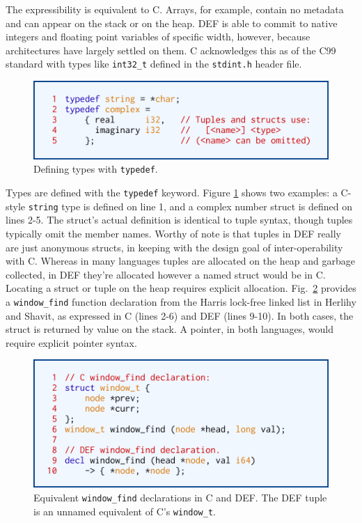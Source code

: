 The expressibility is equivalent to C.  Arrays, for example, contain no metadata and can appear on the stack or on the heap.  DEF is able to commit to native integers and floating point variables of specific width, however, because architectures have largely settled on them.  C acknowledges this as of the C99 standard with types like \texttt{int32\_t} defined in the \texttt{stdint.h} header file.\cite{C99FWInts}

\begin{figure}[htbp!]
        \centering
        \includegraphics[scale=0.25]{gfx/typedef}
        \caption{Defining types with \texttt{typedef}.}
        \label{fig:typedef}
\end{figure}

Types are defined with the \texttt{typedef} keyword.  Figure \ref{fig:typedef} shows two examples: a C-style \texttt{string} type is defined on line 1, and a complex number struct is defined on lines 2-5.  The struct's actual definition is identical to tuple syntax, though tuples typically omit the member names.  Worthy of note is that tuples in DEF really are just anonymous structs, in keeping with the design goal of inter-operability with C.  Whereas in many languages tuples are allocated on the heap and garbage collected, in DEF they're allocated however a named struct would be in C.  Locating a struct or tuple on the heap requires explicit allocation.  Fig.~\ref{fig:window-find} provides a \texttt{window\_{}find} function declaration from the Harris lock-free linked list\cite{Harris} in Herlihy and Shavit,\cite{HSBook} as expressed in C (lines 2-6) and DEF (lines 9-10).  In both cases, the struct is returned by value on the stack.  A pointer, in both languages, would require explicit pointer syntax.

\begin{figure}[htbp!]
        \centering
        \includegraphics[scale=0.25]{gfx/window-find}
        \caption{Equivalent \texttt{window\_{}find} declarations in C and DEF.  The DEF tuple is an unnamed equivalent of C's \texttt{window\_{}t}.}
        \label{fig:window-find}
\end{figure}

